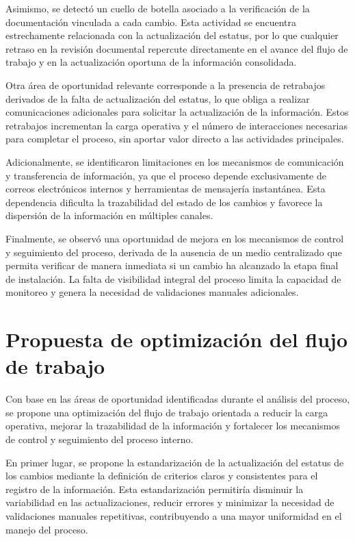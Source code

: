 \documentclass[12pt]{article}
\begin{document}
Asimismo, se detectó un cuello de botella asociado a la verificación de la documentación vinculada a cada cambio. Esta actividad se encuentra estrechamente relacionada con la actualización del estatus, por lo que cualquier retraso en la revisión documental repercute directamente en el avance del flujo de trabajo y en la actualización oportuna de la información consolidada.

Otra área de oportunidad relevante corresponde a la presencia de retrabajos derivados de la falta de actualización del estatus, lo que obliga a realizar comunicaciones adicionales para solicitar la actualización de la información. Estos retrabajos incrementan la carga operativa y el número de interacciones necesarias para completar el proceso, sin aportar valor directo a las actividades principales.

Adicionalmente, se identificaron limitaciones en los mecanismos de comunicación y transferencia de información, ya que el proceso depende exclusivamente de correos electrónicos internos y herramientas de mensajería instantánea. Esta dependencia dificulta la trazabilidad del estado de los cambios y favorece la dispersión de la información en múltiples canales.

Finalmente, se observó una oportunidad de mejora en los mecanismos de control y seguimiento del proceso, derivada de la ausencia de un medio centralizado que permita verificar de manera inmediata si un cambio ha alcanzado la etapa final de instalación. La falta de visibilidad integral del proceso limita la capacidad de monitoreo y genera la necesidad de validaciones manuales adicionales.


\section*{Propuesta de optimización del flujo de trabajo}
Con base en las áreas de oportunidad identificadas durante el análisis del proceso, se propone una optimización del flujo de trabajo orientada a reducir la carga operativa, mejorar la trazabilidad de la información y fortalecer los mecanismos de control y seguimiento del proceso interno.

En primer lugar, se propone la estandarización de la actualización del estatus de los cambios mediante la definición de criterios claros y consistentes para el registro de la información. Esta estandarización permitiría disminuir la variabilidad en las actualizaciones, reducir errores y minimizar la necesidad de validaciones manuales repetitivas, contribuyendo a una mayor uniformidad en el manejo del proceso.
\end{document}
